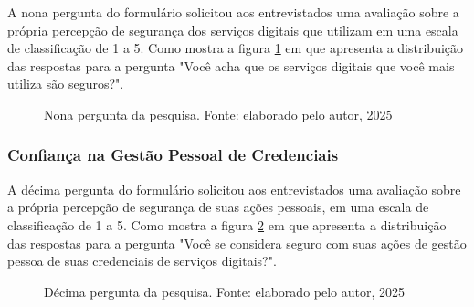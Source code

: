 \documentclass[12pt]{article}
\begin{document}
A nona pergunta do formulário solicitou aos entrevistados uma avaliação sobre a própria 
percepção de segurança dos serviços digitais que utilizam em uma escala de classificação
de 1 a 5.
Como mostra a figura \ref{fig:resposta_9} em que apresenta a distribuição das
respostas para a pergunta "Você acha que os serviços digitais que você mais utiliza são
seguros?".

\begin{figure}[htb]
    \centering
    \caption{Nona pergunta da pesquisa. Fonte: elaborado pelo autor, 2025}
    \label{fig:resposta_9}
\end{figure}
\FloatBarrier

\subsubsection{Confiança na Gestão Pessoal de Credenciais}

A décima pergunta do formulário solicitou aos entrevistados uma avaliação sobre a própria
percepção de segurança de suas ações pessoais, em uma escala de classificação de 1 a 5.
Como mostra a figura \ref{fig:resposta_10} em que apresenta a distribuição das
respostas para a pergunta "Você se considera seguro com suas ações de gestão pessoa de suas
credenciais de serviços digitais?".

\begin{figure}[htb]
    \centering
    \caption{Décima pergunta da pesquisa. Fonte: elaborado pelo autor, 2025}
    \label{fig:resposta_10}
\end{figure}
\FloatBarrier
\end{document}
